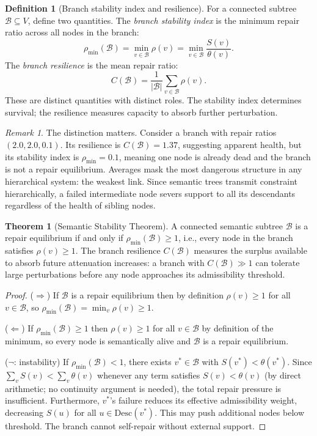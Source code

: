 \documentclass[11pt, a4paper]{article}
\theoremstyle{definition}
\newtheorem{definition}{Definition}
\newtheorem{theorem}{Theorem}
\theoremstyle{remark}
\newtheorem{remark}{Remark}
\begin{document}
\begin{definition}[Branch stability index and resilience]
For a connected subtree $\mathcal{B} \subseteq V$, define two quantities.
The \textit{branch stability index} is the minimum repair ratio across all
nodes in the branch:
\[
\rho_{\min}(\mathcal{B}) = \min_{v \in \mathcal{B}} \rho(v) = \min_{v \in \mathcal{B}} \frac{S(v)}{\theta(v)}.
\]
The \textit{branch resilience} is the mean repair ratio:
\[
C(\mathcal{B}) = \frac{1}{|\mathcal{B}|} \sum_{v \in \mathcal{B}} \rho(v).
\]
These are distinct quantities with distinct roles. The stability index
determines survival; the resilience measures capacity to absorb further
perturbation.
\end{definition}

\begin{remark}
The distinction matters. Consider a branch with repair ratios $(2.0, 2.0, 0.1)$. Its
resilience is $C(\mathcal{B}) = 1.37$, suggesting apparent health, but its
stability index is $\rho_{\min} = 0.1$, meaning one node is already dead
and the branch is not a repair equilibrium. Averages mask the most dangerous
structure in any hierarchical system: the weakest link. Since semantic trees
transmit constraint hierarchically, a failed intermediate node severs support
to all its descendants regardless of the health of sibling nodes.
\end{remark}

\begin{theorem}[Semantic Stability Theorem]
A connected semantic subtree $\mathcal{B}$ is a repair equilibrium if and
only if $\rho_{\min}(\mathcal{B}) \geq 1$, i.e., every node in the branch
satisfies $\rho(v) \geq 1$. The branch resilience $C(\mathcal{B})$ measures
the surplus available to absorb future attenuation increases: a branch with
$C(\mathcal{B}) \gg 1$ can tolerate large perturbations before any node
approaches its admissibility threshold.
\end{theorem}

\begin{proof}
($\Rightarrow$) If $\mathcal{B}$ is a repair equilibrium then by definition
$\rho(v) \geq 1$ for all $v \in \mathcal{B}$, so
$\rho_{\min}(\mathcal{B}) = \min_v \rho(v) \geq 1$.

($\Leftarrow$) If $\rho_{\min}(\mathcal{B}) \geq 1$ then $\rho(v) \geq 1$
for all $v \in \mathcal{B}$ by definition of the minimum, so every node is
semantically alive and $\mathcal{B}$ is a repair equilibrium.

($\neg$: instability) If $\rho_{\min}(\mathcal{B}) < 1$, there exists
$v^* \in \mathcal{B}$ with $S(v^*) < \theta(v^*)$. Since
$\sum_{v} S(v) < \sum_{v} \theta(v)$ whenever any term satisfies
$S(v) < \theta(v)$ (by direct arithmetic; no continuity argument is needed),
the total repair pressure is insufficient. Furthermore, $v^*$'s failure
reduces its effective admissibility weight, decreasing $S(u)$ for all
$u \in \mathrm{Desc}(v^*)$. This may push additional nodes below threshold.
The branch cannot self-repair without external support.
\end{proof}
\end{document}
